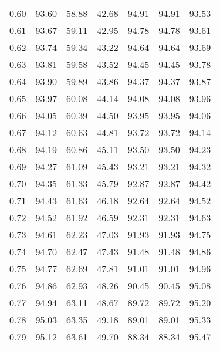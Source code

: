 \begin{tabular}{|c|c|c|c|c|c|c|}
      0.60 &     93.60 &     58.88 &      42.68 &   94.91 &      94.91 &         93.53 \\
      0.61 &     93.67 &     59.11 &      42.95 &   94.78 &      94.78 &         93.61 \\
      0.62 &     93.74 &     59.34 &      43.22 &   94.64 &      94.64 &         93.69 \\
      0.63 &     93.81 &     59.58 &      43.52 &   94.45 &      94.45 &         93.78 \\
      0.64 &     93.90 &     59.89 &      43.86 &   94.37 &      94.37 &         93.87 \\
      0.65 &     93.97 &     60.08 &      44.14 &   94.08 &      94.08 &         93.96 \\
      0.66 &     94.05 &     60.39 &      44.50 &   93.95 &      93.95 &         94.06 \\
      0.67 &     94.12 &     60.63 &      44.81 &   93.72 &      93.72 &         94.14 \\
      0.68 &     94.19 &     60.86 &      45.11 &   93.50 &      93.50 &         94.23 \\
      0.69 &     94.27 &     61.09 &      45.43 &   93.21 &      93.21 &         94.32 \\
      0.70 &     94.35 &     61.33 &      45.79 &   92.87 &      92.87 &         94.42 \\
      0.71 &     94.43 &     61.63 &      46.18 &   92.64 &      92.64 &         94.52 \\
      0.72 &     94.52 &     61.92 &      46.59 &   92.31 &      92.31 &         94.63 \\
      0.73 &     94.61 &     62.23 &      47.03 &   91.93 &      91.93 &         94.75 \\
      0.74 &     94.70 &     62.47 &      47.43 &   91.48 &      91.48 &         94.86 \\
      0.75 &     94.77 &     62.69 &      47.81 &   91.01 &      91.01 &         94.96 \\
      0.76 &     94.86 &     62.93 &      48.26 &   90.45 &      90.45 &         95.08 \\
      0.77 &     94.94 &     63.11 &      48.67 &   89.72 &      89.72 &         95.20 \\
      0.78 &     95.03 &     63.35 &      49.18 &   89.01 &      89.01 &         95.33 \\
      0.79 &     95.12 &     63.61 &      49.70 &   88.34 &      88.34 &         95.47 \\

\end{tabular}

